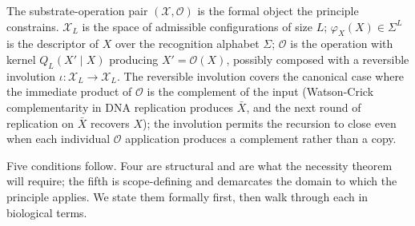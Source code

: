 \documentclass[aps,prx,reprint,amsmath,amssymb,floatfix,superscriptaddress,nofootinbib]{revtex4-2}
\theoremstyle{plain-thm}
\theoremstyle{definition-thm}
\newcommand{\descX}{\varphi_X}
\newcommand{\Xset}{\mathcal{X}}
\newcommand{\Op}{\mathcal{O}}
\begin{document}
The substrate-operation pair $(\Xset, \Op)$ is the formal object the principle constrains. $\Xset_L$ is the space of admissible configurations of size $L$; $\descX(X) \in \Sigma^L$ is the descriptor of $X$ over the recognition alphabet $\Sigma$; $\Op$ is the operation with kernel $Q_L(X' \mid X)$ producing $X' = \Op(X)$, possibly composed with a reversible involution $\iota: \Xset_L \to \Xset_L$. The reversible involution covers the canonical case where the immediate product of $\Op$ is the complement of the input (Watson-Crick complementarity in DNA replication produces $\bar{X}$, and the next round of replication on $\bar{X}$ recovers $X$); the involution permits the recursion to close even when each individual $\Op$ application produces a complement rather than a copy.

Five conditions follow. Four are structural and are what the necessity theorem will require; the fifth is scope-defining and demarcates the domain to which the principle applies. We state them formally first, then walk through each in biological terms.
\end{document}
